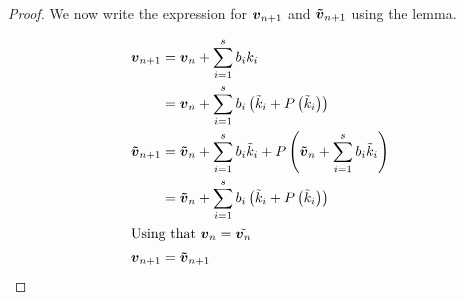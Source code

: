 \begin{proof}
 We now write the expression for ${\boldsymbol {v}}_{n+1}$ and ${\boldsymbol {\tilde{v}}}_{n+1}$ using the lemma.
 
 \begin{align*}
 {\boldsymbol {v}}_{n+1}&={\boldsymbol {v}}_{n}+\sum_{i=1}^{s}b_{i}k_{i}\\
 &={\boldsymbol {v}}_{n}+\sum_{i=1}^{s}b_{i}\left(\tilde{k}_{i}+P\left(\tilde{k}_{i}\right)\right)\\
 {\boldsymbol {\tilde{v}}}_{n+1}&={\boldsymbol {\tilde{v}}}_{n}+\sum_{i=1}^{s}b_{i}\tilde{k}_{i}+P\left({\boldsymbol {\tilde{v}}}_{n}+\sum_{i=1}^{s}b_{i}\tilde{k}_{i}\right)\\
 &={\boldsymbol {\tilde{v}}}_{n}+\sum_{i=1}^{s}b_{i}\left(\tilde{k}_{i}+P\left(\tilde{k}_{i}\right)\right)\\
 \intertext{Using that ${\boldsymbol {v}}_{n}=\tilde{{\boldsymbol {v}}_{n}}$}
 {\boldsymbol {v}}_{n+1}&={\boldsymbol {\tilde{v}}}_{n+1}
 \end{align*}

 \end{proof}
 
